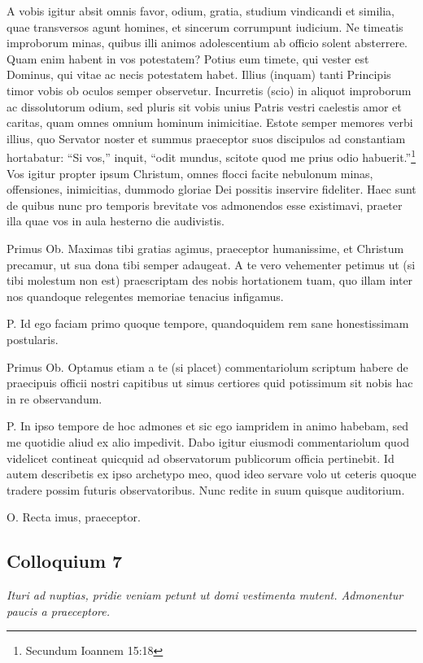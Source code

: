 \documentclass{article}
\begin{document}
A vobis igitur absit omnis favor, odium, gratia, studium vindicandi et similia, quae transversos agunt homines, et sincerum corrumpunt iudicium. Ne timeatis improborum minas, quibus illi animos adolescentium ab officio solent absterrere. Quam enim habent in vos potestatem? Potius eum timete, qui vester est Dominus, qui vitae ac necis potestatem habet. Illius (inquam) tanti Principis timor vobis ob oculos semper observetur. Incurretis (scio) in aliquot improborum ac dissolutorum odium, sed pluris sit vobis unius Patris vestri caelestis amor et caritas, quam omnes omnium hominum inimicitiae. Estote semper memores verbi illius, quo Servator noster et summus praeceptor suos discipulos ad constantiam hortabatur: ``Si vos,'' inquit, ``odit mundus, scitote quod me prius odio habuerit.''\footnote{Secundum Ioannem 15:18} Vos igitur propter ipsum Christum, omnes flocci facite nebulonum minas, offensiones, inimicitias, dummodo gloriae Dei possitis inservire fideliter. Haec sunt de quibus nunc pro temporis brevitate vos admonendos esse existimavi, praeter illa quae vos in aula hesterno die audivistis.

Primus Ob. Maximas tibi gratias agimus, praeceptor humanissime, et Christum precamur, ut sua dona tibi semper adaugeat. A te vero vehementer petimus ut (si tibi molestum non est) praescriptam des nobis hortationem tuam, quo illam inter nos quandoque relegentes memoriae tenacius infigamus.

P. Id ego faciam primo quoque tempore, quandoquidem rem sane honestissimam postularis.

Primus Ob. Optamus etiam a te (si placet) commentariolum scriptum habere de praecipuis officii nostri capitibus ut simus certiores quid potissimum sit nobis hac in re observandum.

P. In ipso tempore de hoc admones et sic ego iampridem in animo habebam, sed me quotidie aliud ex alio impedivit. Dabo igitur eiusmodi commentariolum quod videlicet contineat quicquid ad observatorum publicorum officia pertinebit. Id autem describetis ex ipso archetypo meo, quod ideo servare volo ut ceteris quoque tradere possim futuris observatoribus. Nunc redite in suum quisque auditorium.

O. Recta imus, praeceptor.

\subsection{Colloquium 7}
\emph{Ituri ad nuptias, pridie veniam petunt ut domi vestimenta mutent. Admonentur paucis a praeceptore.}
\end{document}
